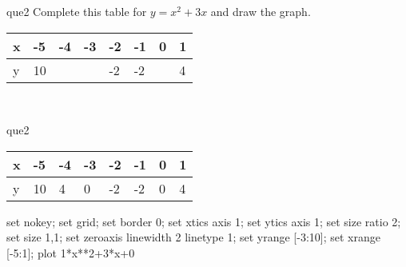 \documentclass[13.5pt, varwidth=true]{beamer}
\begin{document}
\begin{frame}[shrink=19,fragile]
	\begin{beamercolorbox}[rounded=true, left, shadow=true,wd=14.8cm]{que2}
		 Complete this table for $y = x^{2} + 3x$ and draw the graph. \\[0.3cm] \renewcommand{\arraystretch}{1.2}\begin{tabular}{|C|C|C|C|C|C|C|C|} \hline x & -5 & -4 & -3 & -2 & -1 & 0 & 1 \\ \hline y & 10 &  &  & -2 & -2 &  & 4\\ \hline \end{tabular}\\[0.3cm]
	\end{beamercolorbox}
\end{frame}
\begin{frame}[shrink=19,fragile]
	\begin{beamercolorbox}[rounded=true, left, shadow=true,wd=14.8cm]{que2}
 		\renewcommand{\arraystretch}{1.2}\begin{tabular}{|C|C|C|C|C|C|C|C|} \hline x & -5 & -4 & -3 & -2 & -1 & 0 & 1 \\ \hline y & 10 & 4 & 0 & -2 & -2 & 0 & 4\\ \hline \end{tabular}\begin{gnuplot}[terminal=pdf] set nokey; set grid; set border 0; set xtics axis 1; set ytics axis 1; set size ratio 2; set size 1,1; set zeroaxis linewidth 2 linetype 1; set yrange [-3:10]; set xrange [-5:1]; plot 1*x**2+3*x+0 \end{gnuplot}
	\end{beamercolorbox}
\end{frame}
\end{document}
